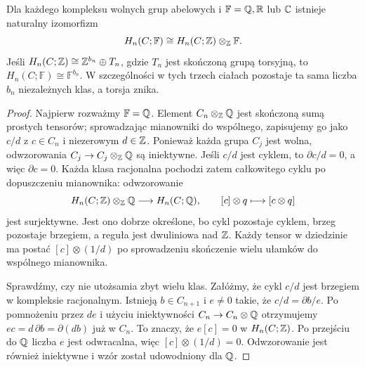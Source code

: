\begin{twierdzenie}
\label{thm:homologia-char-zero}
Dla każdego kompleksu wolnych grup abelowych
i $\mathbb F=\mathbb{Q},\mathbb{R}$ lub $\mathbb{C}$ istnieje naturalny
izomorfizm
\begin{equation}\label{eq:homologia-char-zero}
 H_n(C;\mathbb F)
 \cong H_n(C;\mathbb{Z})\otimes_{\mathbb{Z}}\mathbb F.
\end{equation}
Jeśli $H_n(C;\mathbb{Z})\cong\mathbb{Z}^{b_n}\oplus T_n$,
gdzie $T_n$ jest skończoną grupą torsyjną, to
$H_n(C;\mathbb F)\cong\mathbb F^{b_n}$.
W szczególności w tych trzech ciałach
pozostaje ta sama liczba $b_n$ niezależnych
klas, a torsja znika.
\end{twierdzenie}
\begin{proof}
Najpierw rozważmy $\mathbb F=\mathbb{Q}$.
Element $C_n\otimes_{\mathbb{Z}}\mathbb{Q}$ jest skończoną
sumą prostych tensorów; sprowadzając
mianowniki do wspólnego, zapisujemy go jako
$c/d$ z $c\in C_n$ i niezerowym
$d\in\mathbb{Z}$. Ponieważ każda grupa $C_j$
jest wolna, odwzorowania
$C_j\to C_j\otimes_{\mathbb{Z}}\mathbb{Q}$ są iniektywne.
Jeśli $c/d$ jest cyklem, to
$\partial c/d=0$, a więc $\partial c=0$.
Każda klasa racjonalna pochodzi zatem
całkowitego cyklu po dopuszczeniu mianownika:
odwzorowanie
\[
 H_n(C;\mathbb{Z})\otimes_{\mathbb{Z}}\mathbb{Q}\longrightarrow H_n(C;\mathbb{Q}),
 \qquad [c]\otimes q\longmapsto[c\otimes q]
\]
jest surjektywne. Jest ono dobrze określone,
bo cykl pozostaje cyklem, brzeg pozostaje
brzegiem, a reguła jest dwuliniowa nad $\mathbb{Z}$.
Każdy tensor w dziedzinie ma postać $[c]\otimes(1/d)$
po sprowadzeniu skończenie wielu ułamków do wspólnego mianownika.

Sprawdźmy, czy nie utożsamia zbyt wielu klas.
Załóżmy, że cykl $c/d$ jest brzegiem
w kompleksie racjonalnym. Istnieją
$b\in C_{n+1}$ i $e\ne0$ takie, że
$c/d=\partial b/e$. Po pomnożeniu przez
$de$ i użyciu iniektywności
$C_n\to C_n\otimes\mathbb{Q}$ otrzymujemy
$ec=d\,\partial b=\partial(db)$
już w $C_n$. To znaczy, że $e[c]=0$
w $H_n(C;\mathbb{Z})$. Po przejściu do $\mathbb{Q}$
liczba $e$ jest odwracalna, więc
$[c]\otimes(1/d)=0$. Odwzorowanie jest
również iniektywne i wzór został
udowodniony dla $\mathbb{Q}$.


\end{proof}
